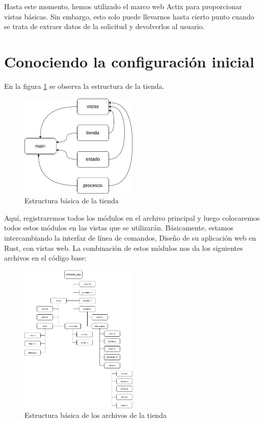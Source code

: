 Hasta este momento, hemos utilizado el marco web Actix para proporcionar vistas básicas. Sin embargo, esto solo puede llevarnos hasta cierto punto cuando se trata de extraer datos de la solicitud y devolverlos al usuario.

\section{Conociendo la configuración inicial}
En la figura \ref{cap3:001} se observa la estructura de la tienda.
 
\begin{figure}[htb]
	\centering
	\includegraphics[width=0.5\textwidth]{capitulo3/estru_tienda.png}
	\caption{Estructura básica de la tienda}
	\label{cap3:001}
\end{figure}

Aquí, registraremos todos los módulos en el archivo principal y luego colocaremos todos estos módulos en las vistas que se utilizarán. Básicamente, estamos intercambiando la interfaz de línea de comandos, Diseño de su aplicación web en Rust, con vistas web. La combinación de estos módulos nos da los siguientes archivos en el código base:

\begin{figure}[htb]
	\centering
	\includegraphics[width=0.5\textwidth]{capitulo3/estru_archivo.png}
	\caption{Estructura básica de los archivos de la tienda}
	\label{cap3:002}
\end{figure}

